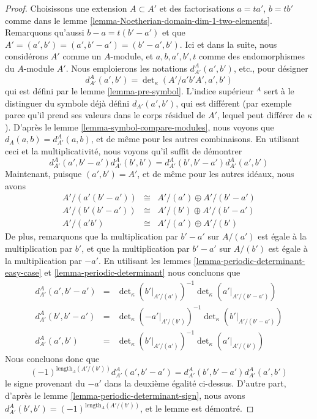 \begin{proof}
\medskip\noindent
Choisissons une extension $A \subset A'$ et des factorisations
$a = ta'$, $b = tb'$ comme dans le
lemme \ref{lemma-Noetherian-domain-dim-1-two-elements}.
Remarquons qu'aussi $b - a = t(b' - a')$ et que
$A' = (a', b') = (a', b' - a') = (b' - a', b')$.
Ici et dans la suite, nous considérons $A'$ comme un $A$-module, et
$a, b, a', b', t$ comme des endomorphismes du $A$-module $A'$.
Nous emploierons les notations $d^A_{A'}(a', b')$, etc., pour désigner
$$
d^A_{A'}(a', b')
=
\det\nolimits_\kappa(A'/a'b'A', a', b')
$$
qui est défini par le lemme \ref{lemma-pre-symbol}. L'indice supérieur ${}^A$
sert à le distinguer du symbole déjà défini
$d_{A'}(a', b')$, qui est différent (par exemple parce qu'il prend ses valeurs
dans le corps résiduel de $A'$, lequel peut différer de $\kappa$).
D'après le lemme \ref{lemma-symbol-compare-modules}, nous voyons que
$d_A(a, b) = d^A_{A'}(a, b)$,
et de même pour les autres combinaisons.
En utilisant ceci et la multiplicativité, nous voyons qu'il suffit de démontrer
$$
d^A_{A'}(a', b' - a') d^A_{A'}(b', b')
=
d^A_{A'}(b', b' - a') d^A_{A'}(a', b')
$$
Maintenant, puisque $(a', b') = A'$, et de même pour les autres idéaux, nous avons
$$
\begin{matrix}
A'/(a'(b' - a')) & \cong & A'/(a') \oplus A'/(b' - a') \\
A'/(b'(b' - a')) & \cong & A'/(b') \oplus A'/(b' - a') \\
A'/(a'b') & \cong & A'/(a') \oplus A'/(b')
\end{matrix}
$$
De plus, remarquons que la multiplication par $b' - a'$ sur
$A/(a')$ est égale à la multiplication par $b'$, et que
la multiplication par $b' - a'$ sur $A/(b')$ est égale à la multiplication par $-a'$.
En utilisant les lemmes
\ref{lemma-periodic-determinant-easy-case} et
\ref{lemma-periodic-determinant}
nous concluons que
$$
\begin{matrix}
d^A_{A'}(a', b' - a') & = &
\det\nolimits_\kappa(b'|_{A'/(a')})^{-1}
\det\nolimits_\kappa(a'|_{A'/(b' - a')}) \\
d^A_{A'}(b', b' - a') & = &
\det\nolimits_\kappa(-a'|_{A'/(b')})^{-1}
\det\nolimits_\kappa(b'|_{A'/(b' - a')}) \\
d^A_{A'}(a', b') & = &
\det\nolimits_\kappa(b'|_{A'/(a')})^{-1}
\det\nolimits_\kappa(a'|_{A'/(b')})
\end{matrix}
$$
Nous concluons donc que
$$
(-1)^{\text{length}_A(A'/(b'))}
d^A_{A'}(a', b' - a')
=
d^A_{A'}(b', b' - a') d^A_{A'}(a', b')
$$
le signe provenant du $-a'$ dans la deuxième égalité ci-dessus.
D'autre part, d'après le lemme \ref{lemma-periodic-determinant-sign}, nous avons
$d^A_{A'}(b', b') = (-1)^{\text{length}_A(A'/(b'))}$, et le lemme
est démontré.
\end{proof}

